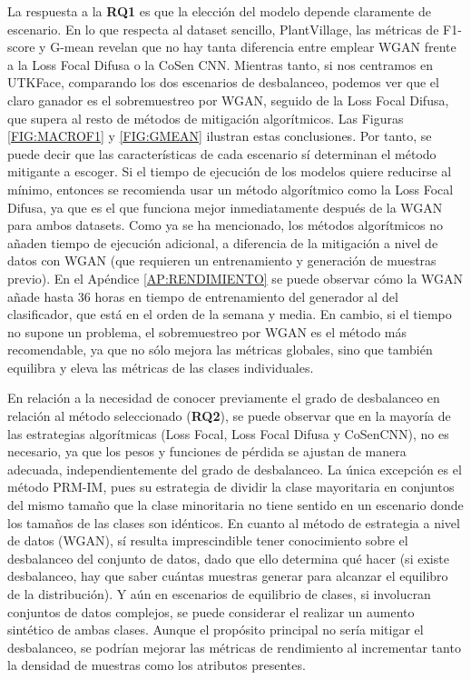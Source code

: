 
La respuesta a la \textbf{RQ1} es que la elección del modelo depende claramente de escenario. En lo que respecta al dataset sencillo, PlantVillage, las métricas de F1-score y G-mean revelan que no hay tanta diferencia entre emplear WGAN frente a la Loss Focal Difusa o la CoSen CNN. Mientras tanto, si nos centramos en UTKFace, comparando los dos escenarios de desbalanceo, podemos ver que el claro ganador es el sobremuestreo por WGAN, seguido de la Loss Focal Difusa, que supera al resto de métodos de mitigación algorítmicos. Las Figuras \ref{FIG:MACROF1} y \ref{FIG:GMEAN} ilustran estas conclusiones.
Por tanto, se puede decir que las características de cada escenario sí determinan el método mitigante a escoger. Si el tiempo de ejecución de los modelos quiere reducirse al mínimo, entonces se recomienda usar un método algorítmico como la Loss Focal Difusa, ya que es el que funciona mejor inmediatamente después de la WGAN para ambos datasets. Como ya se ha mencionado, los métodos algorítmicos no añaden tiempo de ejecución adicional, a diferencia de la mitigación a nivel de datos con WGAN (que requieren un entrenamiento y generación de muestras previo).
En el Apéndice \ref{AP:RENDIMIENTO} se puede observar cómo la WGAN añade hasta 36 horas en tiempo de entrenamiento del generador al del clasificador, que está en el orden de la semana y media.
En cambio, si el tiempo no supone un problema, el sobremuestreo por WGAN es el método más recomendable, ya que no sólo mejora las métricas globales, sino que también equilibra y eleva las métricas de las clases individuales.

En relación a la necesidad de conocer previamente el grado de desbalanceo en relación al método seleccionado (\textbf{RQ2}), se puede observar que en la mayoría de las estrategias algorítmicas (Loss Focal, Loss Focal Difusa y CoSenCNN), no es necesario, ya que los pesos y funciones de pérdida se ajustan de manera adecuada, independientemente del grado de desbalanceo. La única excepción es el método PRM-IM, pues su estrategia de dividir la clase mayoritaria en conjuntos del mismo tamaño que la clase minoritaria no tiene sentido en un escenario donde los tamaños de las clases son idénticos. En cuanto al método de estrategia a nivel de datos (WGAN), sí resulta imprescindible tener conocimiento sobre el desbalanceo del conjunto de datos, dado que ello determina qué hacer (si existe desbalanceo, hay que saber cuántas muestras generar para alcanzar el equilibro de la distribución). Y aún en escenarios de equilibrio de clases, si involucran conjuntos de datos complejos, se puede considerar el realizar un aumento sintético de ambas clases. Aunque el propósito principal no sería mitigar el desbalanceo, se podrían mejorar las métricas de rendimiento al incrementar tanto la densidad de muestras como los atributos presentes.

